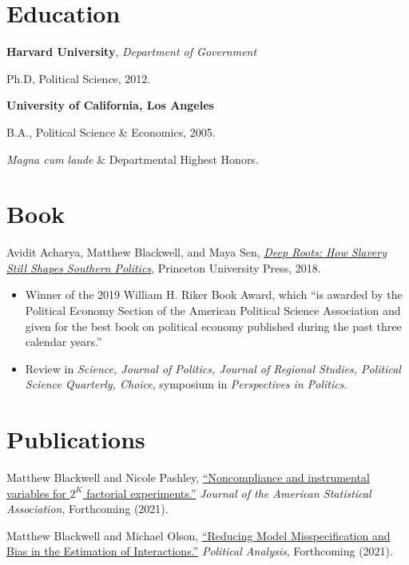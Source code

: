 \documentclass[margin,line,12pt]{res}
\newenvironment{list1}{
  \begin{list}{\ding{113}}{%
      \setlength{\itemsep}{0in}
      \setlength{\parsep}{0in} \setlength{\parskip}{0in}
      \setlength{\topsep}{0in} \setlength{\partopsep}{0in} 
      \setlength{\leftmargin}{0.83 cm}}}{\end{list}}
\begin{document}
\begin{resume}
\section{\sc Education}

{\bf Harvard University}, {\em Department of Government}
\begin{list1}
\item[] Ph.D, Political Science, 2012. 
\end{list1}
{\bf University of California, Los Angeles}
\begin{list1}
\item[] B.A., Political Science \& Economics, 2005.
\item[] \emph{Magna cum laude} \& Departmental Highest Honors.
\end{list1}

\section{\sc Book}

Avidit Acharya, Matthew Blackwell, and Maya Sen, \href{http://www.mattblackwell.org/deep-roots/}{\emph{Deep Roots: How Slavery Still Shapes Southern Politics}}, Princeton University Press, 2018.
\begin{itemize} 
\item Winner of the 2019 William H. Riker Book Award, which ``is awarded by the Political Economy Section of the American Political Science Association and given for the best book on political economy published during the past three calendar years.''
\item Review in \emph{Science, Journal of Politics, Journal of Regional Studies, Political Science Quarterly, Choice}, symposium in \emph{Perspectives in Politics}.
\end{itemize}

\section{\sc Publications}


Matthew Blackwell and Nicole Pashley, \href{https://mattblackwell.org/files/papers/factorial-iv.pdf}{``Noncompliance and instrumental variables for $2^K$ factorial experiments.''} \emph{Journal of the American Statistical Association}, Forthcoming (2021). 


Matthew Blackwell and Michael Olson, \href{https://mattblackwell.org/files/papers/lasso-inters.pdf}{``Reducing Model Misspecification and Bias in the Estimation of Interactions.''} \emph{Political Analysis}, Forthcoming (2021). 



\end{resume}
\end{document}
